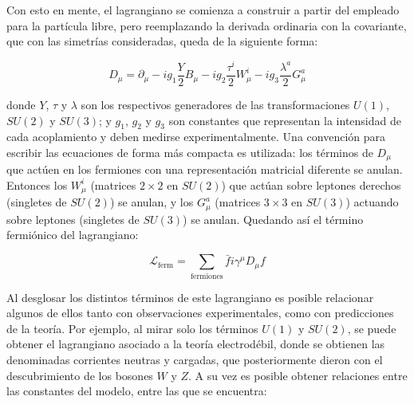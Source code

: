 Con esto en mente, el lagrangiano se comienza a construir a partir del empleado para la partícula libre, pero reemplazando la derivada ordinaria con la covariante, que con las simetrías consideradas, queda de la siguiente forma:


\begin{equation}
D_{\mu} = \partial_{\mu} - i g_{1} \frac{Y}{2}B_{\mu} - i g_{2} \frac{\tau^{i}}{2}W_{\mu}^{i} - i g_{3} \frac{\lambda^{a}}{2}G_{\mu}^{a}
\label{eq:cov_deriv}
\end{equation}

\noindent
donde $Y$, $\tau$ y $\lambda$ son los respectivos generadores de las transformaciones $U(1)$, $SU(2)$ y $SU(3)$; y $g_1$, $g_2$ y $g_3$ son constantes que representan la intensidad de cada acoplamiento y deben medirse experimentalmente. Una convención para escribir las ecuaciones de forma más compacta es utilizada: los términos de $D_{\mu}$ que actúen en los fermiones con una representación matricial diferente se anulan. Entonces los $W_{\mu}^{i}$ (matrices $2\times2$ en $SU(2)$) que actúan sobre leptones derechos (singletes de $SU(2)$) se anulan, y los $G_{\mu}^{a}$ (matrices $3\times3$ en $SU(3)$) actuando sobre leptones (singletes de $SU(3)$) se anulan. Quedando así el término fermiónico del lagrangiano:

\begin{equation}
\mathcal{L}_{\text{ferm}} = \sum_{\text{fermiones}} \bar{f}i\gamma^{\mu}D_{\mu}f
\end{equation}

Al desglosar los distintos términos de este lagrangiano es posible relacionar algunos de ellos tanto con observaciones experimentales, como con predicciones de la teoría. Por ejemplo, al mirar solo los términos $U(1)$ y $SU(2)$, se puede obtener el lagrangiano asociado a la teoría electrodébil, donde se obtienen las denominadas corrientes neutras y cargadas, que posteriormente dieron con el descubrimiento de los bosones $W$ y $Z$. A su vez es posible obtener relaciones entre las constantes del modelo, entre las que se encuentra:



